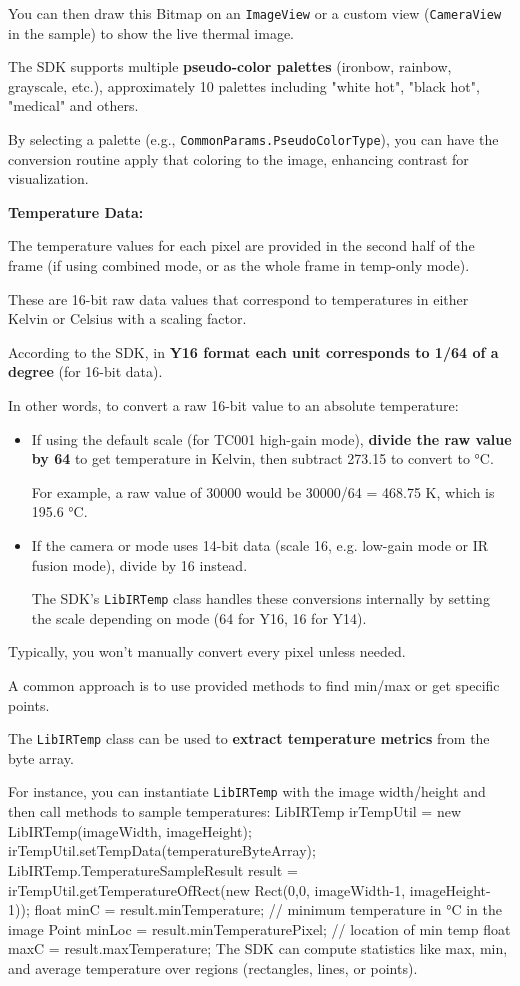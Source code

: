 {You can then draw this Bitmap on an \texttt{ImageView} or a custom view
(\texttt{CameraView} in the sample) to show the live thermal image.

The SDK supports multiple \textbf{pseudo-color palettes}
 (ironbow, rainbow, grayscale, etc.), approximately 10 palettes including "white
 hot", "black hot", "medical" and others.

By selecting a palette (e.g., \texttt{CommonParams.PseudoColorType}), you can have
the conversion routine apply that coloring to the image, enhancing contrast for
visualization.

\textbf{Temperature Data:}

The temperature values for each pixel are provided in the second half of the frame
(if using combined mode, or as the whole frame in temp-only mode).

These are 16-bit raw data values that correspond to temperatures in either Kelvin or
Celsius with a scaling factor.

According to the SDK, in \textbf{Y16 format each unit corresponds to 1/64 of a
degree}
 (for 16-bit data).

In other words, to convert a raw 16-bit value to an absolute temperature:
\begin{itemize}

\item If using the default scale (for TC001 high-gain mode), \textbf{divide the raw value by 64}
 to get temperature in Kelvin, then subtract 273.15 to convert to °C.

For example, a raw value of 30000 would be 30000/64 = 468.75 K, which is 195.6 °C.

\item If the camera or mode uses 14-bit data (scale 16, e.g. low-gain mode or IR fusion mode), divide by 16 instead.

The SDK's \texttt{LibIRTemp} class handles these conversions internally by setting
the scale depending on mode (64 for Y16, 16 for Y14).

\end{itemize}

Typically, you won't manually convert every pixel unless needed.

A common approach is to use provided methods to find min/max or get specific points.

The \texttt{LibIRTemp} class can be used to \textbf{extract temperature metrics}
 from the byte array.

For instance, you can instantiate \texttt{LibIRTemp} with the image width/height and
then call methods to sample temperatures: LibIRTemp irTempUtil = new
LibIRTemp(imageWidth, imageHeight); irTempUtil.setTempData(temperatureByteArray);
LibIRTemp.TemperatureSampleResult result = irTempUtil.getTemperatureOfRect(new
Rect(0,0, imageWidth-1, imageHeight-1)); float minC = result.minTemperature; //
minimum temperature in °C in the image Point minLoc = result.minTemperaturePixel; //
location of min temp float maxC = result.maxTemperature; The SDK can compute
statistics like max, min, and average temperature over regions (rectangles, lines, or
points).

}
